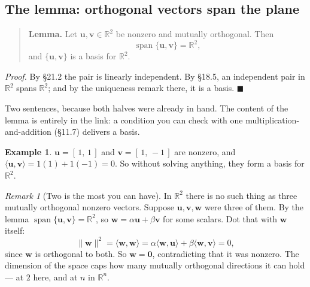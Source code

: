 \documentclass[11pt]{article}
\theoremstyle{definition}
\newtheorem{ex}{Example}[section]
\theoremstyle{remark}
\newtheorem*{rmk}{Remark}
\newcommand{\R}{\mathbb{R}}
\newcommand{\vc}[1]{\mathbf{#1}}
\newcommand{\norm}[1]{\lVert #1\rVert}
\DeclareMathOperator{\spanop}{span}
\newcommand{\lattice}[4]{%
  \draw[step=1cm,gray!25,very thin] (#1,#3) grid (#2,#4);
  \draw[axisline] (#1,0) -- (#2+0.45,0) node[right,font=\scriptsize,black]{$x$};
  \draw[axisline] (0,#3) -- (0,#4+0.45) node[above,font=\scriptsize,black]{$y$};
}
\begin{document}
\subsection{The lemma: orthogonal vectors span the plane}
\begin{quote}
\textbf{Lemma.} Let $\vc{u},\vc{v}\in\R^{2}$ be nonzero and mutually
orthogonal. Then
\[
  \spanop\{\vc{u},\vc{v}\} = \R^{2} ,
\]
and $\{\vc{u},\vc{v}\}$ is a basis for $\R^{2}$.
\end{quote}

\noindent\emph{Proof.} By \S21.2 the pair is linearly independent. By \S18.5, an
independent pair in $\R^{2}$ spans $\R^{2}$; and by the uniqueness remark there,
it is a basis. \hfill$\blacksquare$

\smallskip
\noindent Two sentences, because both halves were already in hand. The content
of the lemma is entirely in the link: a condition you can check with one
multiplication-and-addition (\S11.7) delivers a basis.

\begin{ex}
$\vc{u}=[\,1,\,1\,]$ and $\vc{v}=[\,1,\,-1\,]$ are nonzero, and
$\langle\vc{u},\vc{v}\rangle = 1(1)+1(-1) = 0$. So without solving anything, they
form a basis for $\R^{2}$.
\end{ex}

\begin{center}
\end{center}

\begin{rmk}[Two is the most you can have]
In $\R^{2}$ there is no such thing as three mutually orthogonal nonzero vectors.
Suppose $\vc{u},\vc{v},\vc{w}$ were three of them. By the lemma
$\spanop\{\vc{u},\vc{v}\}=\R^{2}$, so $\vc{w}=\alpha\vc{u}+\beta\vc{v}$ for some
scalars. Dot that with $\vc{w}$ itself:
\[
  \norm{\vc{w}}^{2}
  = \langle\vc{w},\vc{w}\rangle
  = \alpha\langle\vc{w},\vc{u}\rangle + \beta\langle\vc{w},\vc{v}\rangle
  = 0 ,
\]
since $\vc{w}$ is orthogonal to both. So $\vc{w}=\vc{0}$, contradicting that it
was nonzero. The dimension of the space caps how many mutually orthogonal
directions it can hold --- at $2$ here, and at $n$ in $\R^{n}$.
\end{rmk}
\end{document}
